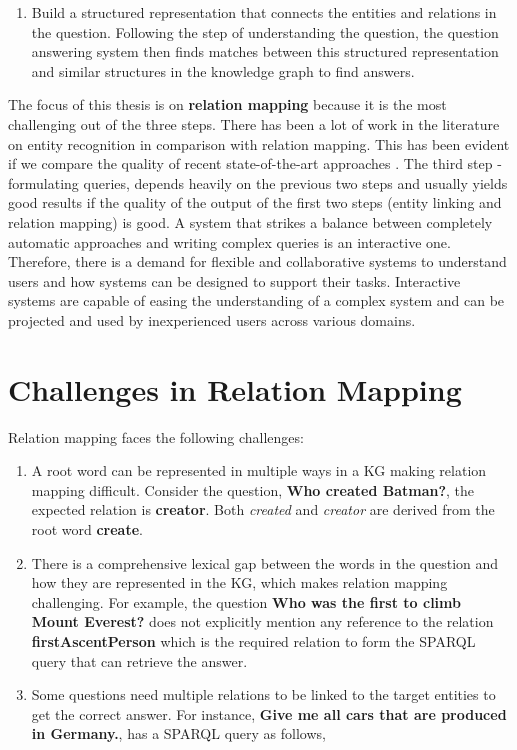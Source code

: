 \begin{sloppypar}
\begin{enumerate}
\item Build a structured representation that connects the entities and relations in the question. Following the step of understanding the question, the question answering system then finds matches between this structured representation and similar structures in the knowledge graph to find answers. 
\end{enumerate}

The focus of this thesis is on \textbf{relation mapping} because it is the most challenging out of the three steps. There has been a lot of work in the literature on entity recognition \cite{chen_shen_huang_wang_2021, OpenTapioca, Weichselbraun, tagme} in comparison with relation mapping. This has been evident if we compare the quality of recent state-of-the-art approaches \cite{falcon2, falcon}. The third step - formulating queries, depends heavily on the previous two steps and usually yields good results if the quality of the output of the first two steps (entity linking and relation mapping) is good. A system that strikes a balance between completely automatic approaches and writing complex queries is an interactive one. Therefore, there is a demand for flexible and collaborative systems to understand users and how systems can be designed to support their tasks. Interactive systems are capable of easing the understanding of a complex system and can be projected and used by inexperienced users across various domains. 

\section{Challenges in Relation Mapping}
Relation mapping faces the following challenges:  
\begin{enumerate}                                               
\item A root word can be represented in multiple ways in a KG making relation mapping difficult. Consider the question, \textbf{Who created Batman?}, the expected relation is \textbf{creator}. Both \textit{created} and \textit{creator} are derived from the root word \textbf{create}.
\item There is a comprehensive lexical gap between the words in the question and how they are represented in the KG, which makes relation mapping challenging. For example, the question \textbf{Who was the first to climb Mount Everest?} does not explicitly mention any reference to the relation \textbf{firstAscentPerson} which is the required relation to form the SPARQL query that can retrieve the answer. 
\item  Some questions need multiple relations to be linked to the target entities to get the correct answer. For instance, \textbf{Give me all cars that are produced in Germany.}, has a SPARQL query as follows,


\end{enumerate}
\end{sloppypar}
